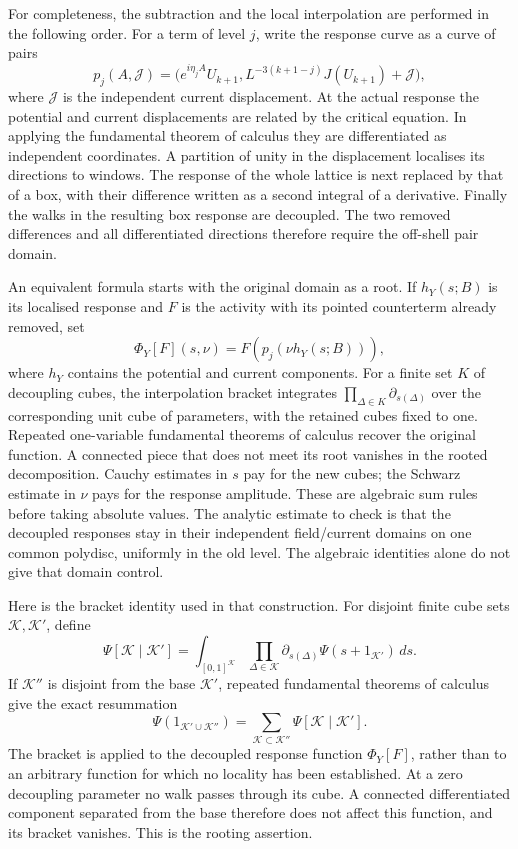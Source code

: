 \documentclass[11pt,letterpaper,reqno]{amsart}
\theoremstyle{definition}
\theoremstyle{remark}
\begin{document}
For completeness, the subtraction and the local interpolation
are performed in the following order. For a term of level $j$,
write the response curve as a curve of pairs
\[
 p_j(A,\mathcal J)=\big(e^{i\eta_jA}U_{k+1},
         L^{-3(k+1-j)}J(U_{k+1})+\mathcal J\big),
\]
where $\mathcal J$ is the independent current displacement.
At the actual response the
potential and current displacements are related by the critical
equation. In applying the fundamental theorem of calculus they
are differentiated as independent coordinates. A partition of
unity in the displacement localises its directions to windows.
The response of the whole lattice is next replaced by that of
a box, with their difference written as a second integral of a
derivative. Finally the walks in the resulting box response are
decoupled. The two removed differences and all differentiated
directions therefore require the off-shell pair domain.

An equivalent formula starts with the original domain as a root.
If $h_Y(s;B)$ is its localised response and $F$ is the activity
with its pointed counterterm already removed, set
\[
 \Phi_Y[F](s,\nu)=F(p_j(\nu h_Y(s;B))),
\]
where $h_Y$ contains the potential and current components.
For a finite set $K$ of decoupling cubes, the interpolation
bracket integrates $\prod_{\Delta\in K}\partial_{s(\Delta)}$
over the corresponding unit cube of parameters, with the
retained cubes fixed to one. Repeated one-variable fundamental
theorems of calculus recover the original function. A connected
piece that does not meet its root vanishes in the rooted
decomposition. Cauchy estimates in $s$ pay for the new cubes;
the Schwarz estimate in $\nu$ pays for the response amplitude.
These are algebraic sum rules before taking absolute values.
The analytic estimate to check is that the decoupled responses stay
in their independent field/current domains on one common polydisc,
uniformly in the old level. The algebraic identities alone do not
give that domain control.

Here is the bracket identity used in that construction.
For disjoint finite cube sets $\mathcal K,\mathcal K'$,
define
\begin{equation}\label{eq:xrg-bracket}
 \Psi[\mathcal K\mid\mathcal K']
  =\int_{[0,1]^{\mathcal K}}
       \prod_{\Delta\in\mathcal K}\partial_{s(\Delta)}
          \Psi(s+1_{\mathcal K'})\,ds.
\end{equation}
If $\mathcal K''$ is disjoint from the base
$\mathcal K'$, repeated fundamental theorems of
calculus give the exact resummation
\begin{equation}\label{eq:xrg-bracket-sum}
 \Psi(1_{\mathcal K'\cup\mathcal K''})
      =\sum_{\mathcal K\subset\mathcal K''}
                      \Psi[\mathcal K\mid\mathcal K'].
\end{equation}
The bracket is applied to the decoupled response
function $\Phi_Y[F]$, rather than to an arbitrary
function for which no locality has been established.
At a zero decoupling parameter no walk passes
through its cube. A connected differentiated
component separated from the base therefore
does not affect this function, and its bracket
vanishes. This is the rooting assertion.
\end{document}
